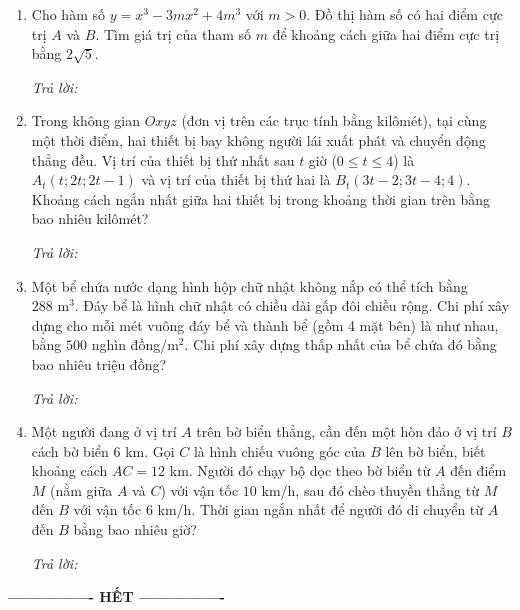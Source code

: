 \documentclass[12pt,a4paper]{article}
\newcommand{\otraloi}{\par\nobreak\smallskip\noindent\textit{Trả lời:}\quad\fbox{\rule{0pt}{11pt}\makebox[0.3cm]{}}\,\fbox{\rule{0pt}{11pt}\makebox[0.3cm]{}}\,\fbox{\rule{0pt}{11pt}\makebox[0.3cm]{}}\,\fbox{\rule{0pt}{11pt}\makebox[0.3cm]{}}}
\begin{document}
\newpage
\begin{enumerate}[start=3]
\item Cho hàm số $y=x^3-3mx^2+4m^3$ với $m>0$. Đồ thị hàm số có hai điểm cực trị $A$ và $B$. Tìm giá trị của tham số $m$ để khoảng cách giữa hai điểm cực trị bằng $2\sqrt5$.
\otraloi

\item Trong không gian $Oxyz$ (đơn vị trên các trục tính bằng kilômét), tại cùng một thời điểm, hai thiết bị bay không người lái xuất phát và chuyển động thẳng đều. Vị trí của thiết bị thứ nhất sau $t$ giờ ($0\le t\le4$) là $A_t(t;2t;2t-1)$ và vị trí của thiết bị thứ hai là $B_t(3t-2;3t-4;4)$. Khoảng cách ngắn nhất giữa hai thiết bị trong khoảng thời gian trên bằng bao nhiêu kilômét?
\otraloi

\item Một bể chứa nước dạng hình hộp chữ nhật không nắp có thể tích bằng $288\text{ m}^3$. Đáy bể là hình chữ nhật có chiều dài gấp đôi chiều rộng. Chi phí xây dựng cho mỗi mét vuông đáy bể và thành bể (gồm 4 mặt bên) là như nhau, bằng $500$ nghìn đồng/m$^2$. Chi phí xây dựng thấp nhất của bể chứa đó bằng bao nhiêu triệu đồng?
\otraloi

\item Một người đang ở vị trí $A$ trên bờ biển thẳng, cần đến một hòn đảo ở vị trí $B$ cách bờ biển $6$ km. Gọi $C$ là hình chiếu vuông góc của $B$ lên bờ biển, biết khoảng cách $AC=12$ km. Người đó chạy bộ dọc theo bờ biển từ $A$ đến điểm $M$ (nằm giữa $A$ và $C$) với vận tốc $10$ km/h, sau đó chèo thuyền thẳng từ $M$ đến $B$ với vận tốc $6$ km/h. Thời gian ngắn nhất để người đó di chuyển từ $A$ đến $B$ bằng bao nhiêu giờ?
\par\smallskip
\begin{center}
\end{center}
\otraloi
\end{enumerate}
\begin{center}\textbf{---------------- HẾT ----------------}\end{center}
\end{document}
